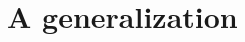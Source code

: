 \documentclass[aap]{imsart}
\begin{document}
\section{A generalization}	\label{sec:generalization}																																																																																																																																																																																																																																																																																																																																																																																																																																																																																																																																																																																																																																																																																																																																																																																																																																																																																																																																																																																																																																																																																																																																																																																																																																																																																																																																																																																																																																																																																																																																																																																																																																																																																																																																																																																																																																																																																																																																																																																																																																																																																																																																																																																																																																																																																																																																																																																																																																																																																																																																																																																																																																																																																																																																																																																																																																																																																																																																																																																																																																																																																																																																																																																																			
\end{document}
